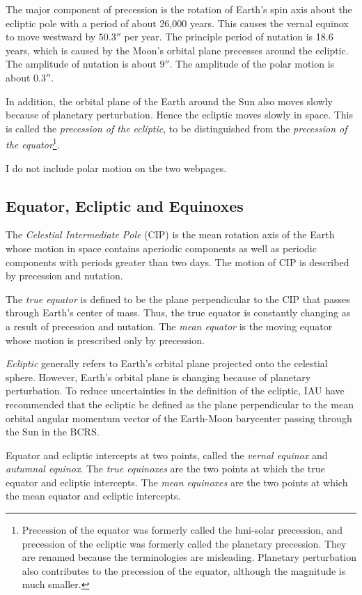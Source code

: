\documentclass[12pt]{article}
\begin{document}
The major component of precession is the rotation of Earth's spin axis about the 
ecliptic pole with a period of about 26,000 years. This causes the vernal equinox 
to move westward by $50.3''$ per year. The principle period of nutation 
is 18.6 years, which is caused by the Moon's orbital plane precesses around 
the ecliptic. The amplitude of nutation is about $9''$. The amplitude 
of the polar motion is about $0.3''$.

In addition, the orbital plane 
of the Earth around the Sun also moves slowly because of planetary perturbation. 
Hence the ecliptic moves slowly in space. This is called the 
{\em precession of the ecliptic}, to be distinguished from 
the {\em precession of the equator}\footnote{Precession of the equator was 
formerly called the luni-solar precession, and precession of the ecliptic 
was formerly called the planetary precession. They are renamed because the 
terminologies are misleading. Planetary perturbation also contributes to 
the precession of the equator, although the magnitude is much smaller.}. 

I do not include polar motion on the two webpages.

\subsection{Equator, Ecliptic and Equinoxes}

The {\em Celestial Intermediate Pole} (CIP) is the mean rotation axis of the Earth 
whose motion in space contains aperiodic components as well as periodic 
components with periods greater than two days. The motion of CIP is described 
by precession and nutation.

The {\em true equator} is defined to be the plane perpendicular to the CIP 
that passes through Earth's center of mass. Thus, the true equator is constantly 
changing as a result of precession and nutation. The {\em mean equator} 
is the moving equator whose motion is prescribed only by precession. 

{\em Ecliptic} generally refers to Earth's orbital plane projected onto the 
celestial sphere. However, Earth's orbital plane is changing because of 
planetary perturbation. To reduce uncertainties in the definition of the 
ecliptic, IAU have recommended that the ecliptic be defined as the plane 
perpendicular to the mean orbital angular momentum vector of the Earth-Moon 
barycenter passing through the Sun in the BCRS.

Equator and ecliptic intercepts at two points, called the {\em vernal equinox} and 
{\em autumnal equinox}. The {\em true equinoxes} are the two points at which the true 
equator and ecliptic intercepts. The {\em mean equinoxes} are the two points 
at which the mean equator and ecliptic intercepts.
\end{document}
